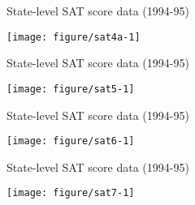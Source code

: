 \documentclass[table]{beamer}\usepackage[]{graphicx}\usepackage[]{color}
\makeatletter
\def\maxwidth{ %
  \ifdim\Gin@nat@width>\linewidth
    \linewidth
  \else
    \Gin@nat@width
  \fi
}
\newenvironment{knitrout}{}{} %
\makeatother
\begin{document}

\begin{frame}[fragile]{State-level SAT score data (1994-95)}

\begin{knitrout}
\color{fgcolor}
\texttt{[image: figure/sat4a-1]} 

\end{knitrout}

\end{frame}



\begin{frame}[fragile]{State-level SAT score data (1994-95)}

\begin{knitrout}
\color{fgcolor}
\texttt{[image: figure/sat5-1]} 

\end{knitrout}

\end{frame}



\begin{frame}[fragile]{State-level SAT score data (1994-95)}

\begin{knitrout}
\color{fgcolor}
\texttt{[image: figure/sat6-1]} 

\end{knitrout}

\end{frame}




\begin{frame}[fragile]{State-level SAT score data (1994-95)}

\begin{knitrout}
\color{fgcolor}
\texttt{[image: figure/sat7-1]} 

\end{knitrout}

\end{frame}
\end{document}
